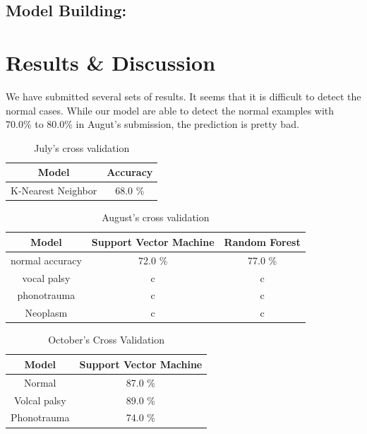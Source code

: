 \documentclass[conference]{IEEEtran}
\begin{document}
	\subsection{Model Building:}
	


\section{Results \& Discussion}

We have submitted several sets of results. It seems that it is difficult to detect the normal cases. While our model are able to detect the normal examples with 70.0\% to 80.0\% in Augut's submission, the prediction is pretty bad. 

\begin{table}[htbp]
	\caption{July's cross validation}
	\begin{center}
		\begin{tabular}{|c|c|}
			\hline
			Model & Accuracy \\
			\hline
			K-Nearest Neighbor & 68.0 \% \\
			\hline
		\end{tabular}
		\label{tab0}
	\end{center}
\end{table}

\begin{table}[htbp]
	\caption{August's cross validation}
	\begin{center}
		\begin{tabular}{|c|c|c|}
			\hline
			Model & Support Vector Machine & Random Forest \\
			\hline
			normal accuracy & 72.0 \% & 77.0 \% \\
			\hline
			vocal palsy & c & c \\
			\hline
			phonotrauma & c & c \\
			\hline
			Neoplasm &c & c\\
			\hline
		\end{tabular}
		\label{tab1}
	\end{center}
\end{table}

\begin{table}[htbp]
	\caption{October's Cross Validation}
	\begin{center}
		\begin{tabular}{|c|c|}
			\hline
			Model & Support Vector Machine \\
			\hline
			Normal & 87.0 \% \\
			\hline
			Volcal palsy & 89.0 \% \\
			\hline
			Phonotrauma & 74.0 \% \\
			\hline
		\end{tabular}
		\label{tab2}
	\end{center}
\end{table}
\end{document}
